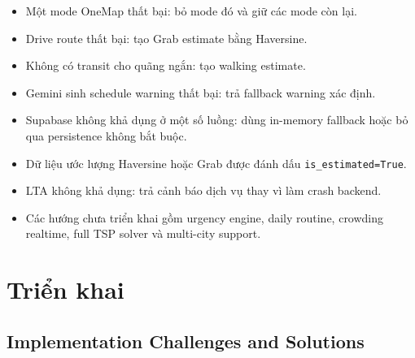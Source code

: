 \documentclass[12pt,a4paper]{article}
\begin{document}
\begin{itemize}
    \item Một mode OneMap thất bại: bỏ mode đó và giữ các mode còn lại.
    \item Drive route thất bại: tạo Grab estimate bằng Haversine.
    \item Không có transit cho quãng ngắn: tạo walking estimate.
    \item Gemini sinh schedule warning thất bại: trả fallback warning xác định.
    \item Supabase không khả dụng ở một số luồng: dùng in-memory fallback hoặc bỏ qua persistence không bắt buộc.
    \item Dữ liệu ước lượng Haversine hoặc Grab được đánh dấu \texttt{is\_estimated=True}.
    \item LTA không khả dụng: trả cảnh báo dịch vụ thay vì làm crash backend.
    \item Các hướng chưa triển khai gồm urgency engine, daily routine, crowding realtime, full TSP solver và multi-city support.
\end{itemize}

\section{Triển khai}

\subsection{Implementation Challenges and Solutions}
\end{document}
